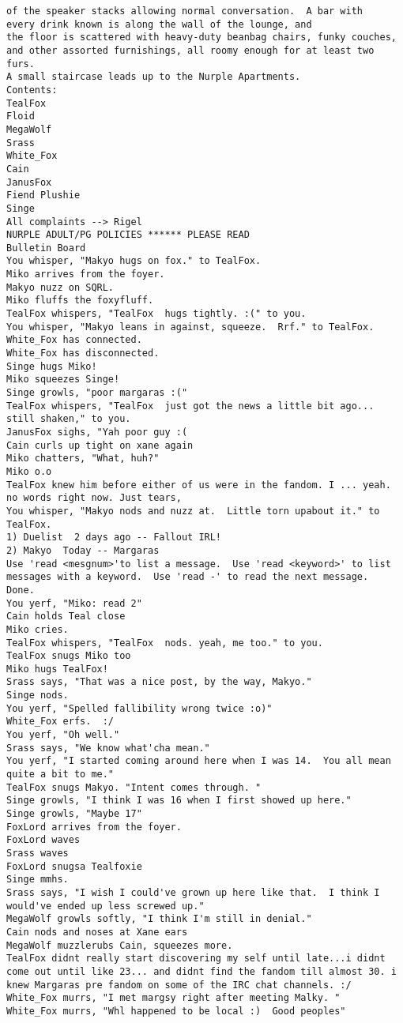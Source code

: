 \begin{verbatim}
of the speaker stacks allowing normal conversation.  A bar with
every drink known is along the wall of the lounge, and
the floor is scattered with heavy-duty beanbag chairs, funky couches,
and other assorted furnishings, all roomy enough for at least two furs.
A small staircase leads up to the Nurple Apartments.
Contents:
TealFox
Floid
MegaWolf
Srass
White_Fox
Cain
JanusFox
Fiend Plushie
Singe
All complaints --> Rigel
NURPLE ADULT/PG POLICIES ****** PLEASE READ
Bulletin Board
You whisper, "Makyo hugs on fox." to TealFox.
Miko arrives from the foyer.
Makyo nuzz on SQRL.
Miko fluffs the foxyfluff.
TealFox whispers, "TealFox  hugs tightly. :(" to you.
You whisper, "Makyo leans in against, squeeze.  Rrf." to TealFox.
White_Fox has connected.
White_Fox has disconnected.
Singe hugs Miko!
Miko squeezes Singe!
Singe growls, "poor margaras :("
TealFox whispers, "TealFox  just got the news a little bit ago... still shaken," to you.
JanusFox sighs, "Yah poor guy :(
Cain curls up tight on xane again
Miko chatters, "What, huh?"
Miko o.o
TealFox knew him before either of us were in the fandom. I ... yeah. no words right now. Just tears,
You whisper, "Makyo nods and nuzz at.  Little torn upabout it." to TealFox.
1) Duelist  2 days ago -- Fallout IRL!
2) Makyo  Today -- Margaras
Use 'read <mesgnum>'to list a message.  Use 'read <keyword>' to list
messages with a keyword.  Use 'read -' to read the next message.
Done.
You yerf, "Miko: read 2"
Cain holds Teal close
Miko cries.
TealFox whispers, "TealFox  nods. yeah, me too." to you.
TealFox snugs Miko too
Miko hugs TealFox!
Srass says, "That was a nice post, by the way, Makyo."
Singe nods.
You yerf, "Spelled fallibility wrong twice :o)"
White_Fox erfs.  :/
You yerf, "Oh well."
Srass says, "We know what'cha mean."
You yerf, "I started coming around here when I was 14.  You all mean quite a bit to me."
TealFox snugs Makyo. "Intent comes through. "
Singe growls, "I think I was 16 when I first showed up here."
Singe growls, "Maybe 17"
FoxLord arrives from the foyer.
FoxLord waves
Srass waves
FoxLord snugsa Tealfoxie
Singe mmhs.
Srass says, "I wish I could've grown up here like that.  I think I would've ended up less screwed up."
MegaWolf growls softly, "I think I'm still in denial."
Cain nods and noses at Xane ears
MegaWolf muzzlerubs Cain, squeezes more.
TealFox didnt really start discovering my self until late...i didnt come out until like 23... and didnt find the fandom till almost 30. i knew Margaras pre fandom on some of the IRC chat channels. :/
White_Fox murrs, "I met margsy right after meeting Malky. "
White_Fox murrs, "Whl happened to be local :)  Good peoples"

\end{verbatim}
